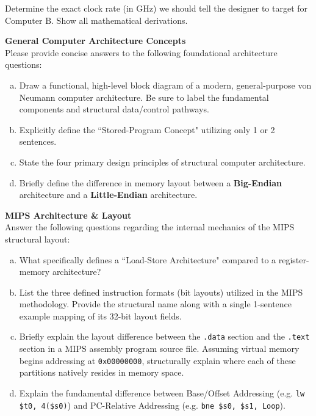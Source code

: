 \documentclass[letterpaper]{report}
\begin{document}
Determine the exact clock rate (in GHz) we should tell the designer to target for $\text{Computer B}$. Show all mathematical derivations.
\ep
\vf
\newpage

%
 {\bf General Computer Architecture Concepts} \\
Please provide concise answers to the following foundational architecture questions:
\begin{enumerate}[(a)]
    \item Draw a functional, high-level block diagram of a modern, general-purpose von Neumann computer architecture. Be sure to label the fundamental components and structural data/control pathways.
    \vspace{2.5in}
    \item Explicitly define the ``Stored-Program Concept" utilizing only 1 or 2 sentences.
    \vspace{1.5in}
    \item State the four primary design principles of structural computer architecture.
    \vspace{2.0in}
    \item Briefly define the difference in memory layout between a \textbf{Big-Endian} architecture and a \textbf{Little-Endian} architecture.
\end{enumerate}
\ep
\vf
\newpage

%
 {\bf MIPS Architecture \& Layout} \\
Answer the following questions regarding the internal mechanics of the MIPS structural layout:
\begin{enumerate}[(a)]
    \item What specifically defines a ``Load-Store Architecture" compared to a register-memory architecture?
    \vspace{1.5in}
    \item List the three defined instruction formats (bit layouts) utilized in the MIPS methodology. Provide the structural name along with a single 1-sentence example mapping of its 32-bit layout fields.
    \vspace{2.5in}
    \item Briefly explain the layout difference between the \texttt{.data} section and the \texttt{.text} section in a MIPS assembly program source file. Assuming virtual memory begins addressing at \texttt{0x00000000}, structurally explain where each of these partitions natively resides in memory space.
    \vspace{2.0in}
    \item Explain the fundamental difference between Base/Offset Addressing (e.g. \texttt{lw \$t0, 4(\$s0)}) and PC-Relative Addressing (e.g. \texttt{bne \$s0, \$s1, Loop}).
\end{enumerate}
\ep
\vf
\newpage
\end{document}
